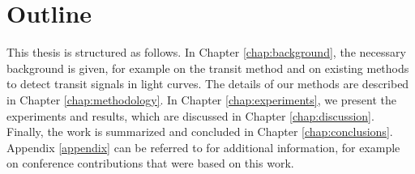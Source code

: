 
\section{Outline}
\label{sec:outline}

This thesis is structured as follows. In Chapter \ref{chap:background}, the necessary background is given, for example on the transit method and on existing methods to detect transit signals in light curves. The details of our methods are described in Chapter \ref{chap:methodology}. In Chapter \ref{chap:experiments}, we present the experiments and results, which are discussed in Chapter \ref{chap:discussion}. Finally, the work is summarized and concluded in Chapter \ref{chap:conclusions}. Appendix \ref{appendix} can be referred to for additional information, for example on conference contributions that were based on this work.
